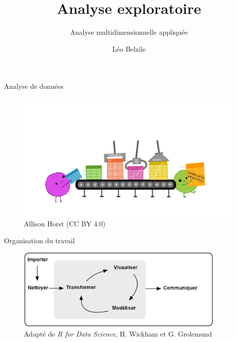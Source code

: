 \documentclass[
  ignorenonframetext,
]{beamer}
\title{Analyse exploratoire}
\subtitle{Analyse multidimensionnelle appliquée}
\author{Léo Belzile}
\date{}
\institute{HEC Montréal}
\begin{document}
\frame{\titlepage}
\ifdefined\Shaded\renewenvironment{Shaded}{\begin{tcolorbox}[sharp corners, borderline west={3pt}{0pt}{shadecolor}, interior hidden, enhanced, breakable, boxrule=0pt, frame hidden]}{\end{tcolorbox}}\fi

\begin{frame}{Analyse de données}
\protect\hypertarget{analyse-de-donnuxe9es}{}
\begin{figure}

{\centering \includegraphics[width=1\textwidth,height=\textheight]{figures/tidydata_5.jpg}

}

\caption{Allison Horst (CC BY 4.0)}

\end{figure}
\end{frame}

\begin{frame}{Organisation du travail}
\protect\hypertarget{organisation-du-travail}{}
\begin{figure}

{\centering \includegraphics[width=0.9\textwidth,height=\textheight]{figures/r4ds_data-science_fr.png}

}

\caption{Adapté de \emph{R for Data Science}, H. Wickham et G.
Grolemund}

\end{figure}
\end{frame}
\end{document}
